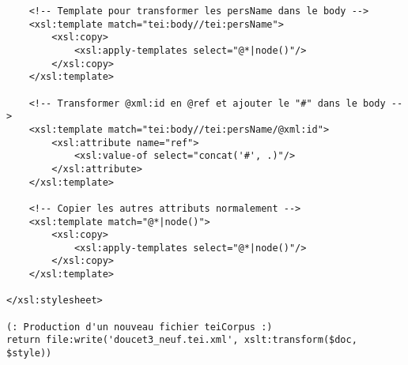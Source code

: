 \begin{verbatim}
    <!-- Template pour transformer les persName dans le body -->
    <xsl:template match="tei:body//tei:persName">
        <xsl:copy>
            <xsl:apply-templates select="@*|node()"/>
        </xsl:copy>
    </xsl:template>

    <!-- Transformer @xml:id en @ref et ajouter le "#" dans le body -->
    <xsl:template match="tei:body//tei:persName/@xml:id">
        <xsl:attribute name="ref">
            <xsl:value-of select="concat('#', .)"/>
        </xsl:attribute>
    </xsl:template>
    
    <!-- Copier les autres attributs normalement -->
    <xsl:template match="@*|node()">
        <xsl:copy>
            <xsl:apply-templates select="@*|node()"/>
        </xsl:copy>
    </xsl:template>
    
</xsl:stylesheet>

(: Production d'un nouveau fichier teiCorpus :)
return file:write('doucet3_neuf.tei.xml', xslt:transform($doc, $style))
\end{verbatim}